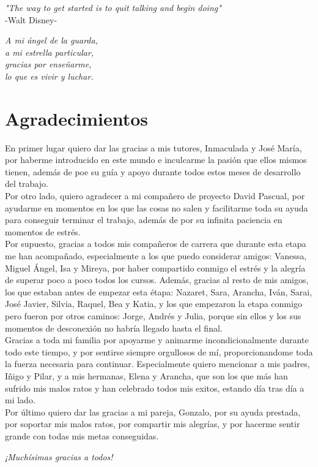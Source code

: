 {
	\vspace*{1cm}
	\begin{flushright}
		\textit{"The way to get started is to quit talking and begin doing"}\\
		\vspace{10pt}
		-Walt Disney-
	\end{flushright}
	
	\vspace*{14cm}
	\begin{flushright}
		\textit{A mi ángel de la guarda,\\
		a mi estrella particular,\\
		gracias por enseñarme,\\
		lo que es vivir y luchar.}
	\end{flushright}
}

\chapter*{Agradecimientos}

En primer lugar quiero dar las gracias a mis tutores, Inmaculada y José María, por haberme introducido en este mundo e inculcarme la pasión que ellos mismos tienen, además de poe su guía y apoyo durante todos estos meses de desarrollo del trabajo.\\
 
Por otro lado, quiero agradecer a mi compañero de proyecto David Pascual, por ayudarme en momentos en los que las cosas no salen y facilitarme toda su ayuda para conseguir terminar el trabajo, además de por su infinita paciencia en momentos de estrés.\\

Por supuesto, gracias a todos mis compañeros de carrera que durante esta etapa me han acompañado, especialmente a los que puedo considerar amigos: Vanessa, Miguel Ángel, Isa y Mireya, por haber compartido conmigo el estrés y la alegría de superar poco a poco todos los cursos. Además, gracias al resto de mis amigos, los que estaban antes de empezar esta étapa: Nazaret, Sara, Arancha, Iván, Sarai, José Javier, Silvia, Raquel, Bea y Katia, y los que empezaron la etapa conmigo pero fueron por otros caminos: Jorge, Andrés y Julia, porque sin ellos y los sus momentos de desconexión no habría llegado hasta el final.\\

Gracias a toda mi familia por apoyarme y animarme incondicionalmente durante todo este tiempo, y por sentirse siempre orgullosos de mí, proporcionandome toda la fuerza necesaria para continuar. Especialmente quiero mencionar a mis padres, Iñigo y Pilar, y a mis hermanas, Elena y Arancha, que son los que más han sufrido mis malos ratos y han celebrado todos mis exitos, estando día tras día a mi lado.\\

Por último quiero dar las gracias a mi pareja, Gonzalo, por su ayuda prestada, por soportar mis malos ratos, por compartir mis alegrías, y por hacerme sentir grande con todas mis metas conseguidas.\\

\begin{flushright}
	\emph{¡Muchí­simas gracias a todos!}
\end{flushright}